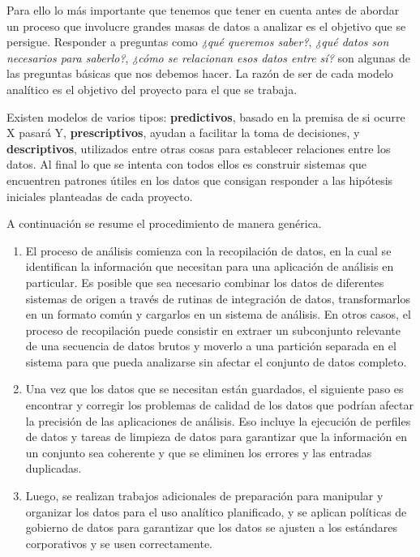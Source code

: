 Para ello lo más importante que tenemos que tener en cuenta antes de abordar un proceso que involucre grandes masas de datos a analizar es el objetivo que se persigue. Responder a preguntas como\textit{ ¿qué queremos saber?}, \textit{¿qué datos son necesarios para saberlo?}, \textit{¿cómo se relacionan esos datos entre sí?} son algunas de las preguntas básicas que nos debemos hacer. La razón de ser de cada modelo analítico es el objetivo del proyecto para el que se trabaja. 

Existen modelos de varios tipos: \textbf{predictivos}, basado en la premisa de si ocurre X pasará Y, \textbf{prescriptivos}, ayudan a facilitar la toma de decisiones, y \textbf{descriptivos}, utilizados entre otras cosas para establecer relaciones entre los datos. Al final lo que se intenta con todos ellos es construir sistemas que encuentren patrones útiles en los datos que consigan responder a las hipótesis iniciales planteadas de cada proyecto.

A continuación se resume el procedimiento de manera genérica. 
\begin{enumerate}
	\item El proceso de análisis comienza con la recopilación de datos, en la cual se identifican la información que necesitan para una aplicación de análisis en particular. Es posible que sea necesario combinar los datos de diferentes sistemas de origen a través de rutinas de integración de datos, transformarlos en un formato común y cargarlos en un sistema de análisis. En otros casos, el proceso de recopilación puede consistir en extraer un subconjunto relevante de una secuencia de datos brutos y moverlo a una partición separada en el sistema para que pueda analizarse sin afectar el conjunto de datos completo.
	\item Una vez que los datos que se necesitan están guardados, el siguiente paso es encontrar y corregir los problemas de calidad de los datos que podrían afectar la precisión de las aplicaciones de análisis. Eso incluye la ejecución de perfiles de datos y tareas de limpieza de datos para garantizar que la información en un conjunto sea coherente y que se eliminen los errores y las entradas duplicadas.
	\item Luego, se realizan trabajos adicionales de preparación para manipular y organizar los datos para el uso analítico planificado, y se aplican políticas de gobierno de datos para garantizar que los datos se ajusten a los estándares corporativos y se usen correctamente.
\end{enumerate}

